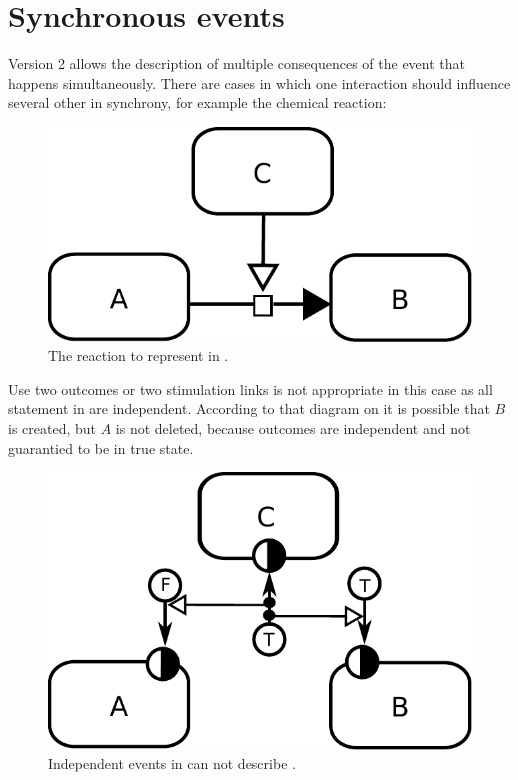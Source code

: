 \section{Synchronous events}\label{sec:syncev}

\SBGNERLone Version 2 allows the description of multiple consequences of the event that happens simultaneously. There are cases in which one interaction should influence several other in synchrony, for example the chemical reaction:

\begin{figure}[H]
  \centering
  \includegraphics[scale = 0.75]{images/synchronous-PD}
  \caption{The reaction to represent in \ER.}
  \label{fig:synchronousPD}
\end{figure}

Use two outcomes or two stimulation links  is not appropriate in this case as all statement in \ER are independent. According to that diagram  on  it is possible that  $B$ is created, but  $A$ is not deleted, because outcomes are independent and not guarantied to be in true state. 

\begin{figure}[H]
  \centering
  \includegraphics[scale = 0.75]{images/asynchronous}
  \caption{Independent events in \ER can not describe .}
  \label{fig:asynchronous}
\end{figure}

